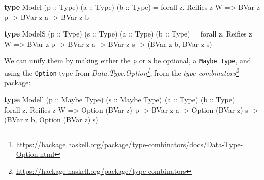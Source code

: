 \documentclass[]{article}
\newenvironment{Shaded}{}{}
\newcommand{\DataTypeTok}[1]{\textcolor[rgb]{0.56,0.13,0.00}{#1}}
\newcommand{\FunctionTok}[1]{\textcolor[rgb]{0.02,0.16,0.49}{#1}}
\newcommand{\KeywordTok}[1]{\textcolor[rgb]{0.00,0.44,0.13}{\textbf{#1}}}
\newcommand{\NormalTok}[1]{#1}
\newcommand{\OtherTok}[1]{\textcolor[rgb]{0.00,0.44,0.13}{#1}}
\renewcommand{\href}[2]{#2\footnote{\url{#1}}}
\begin{document}
\begin{Shaded}
\begin{Highlighting}[]
\KeywordTok{type} \DataTypeTok{Model}\NormalTok{ (}\OtherTok{p ::} \DataTypeTok{Type}\NormalTok{) (}\OtherTok{a ::} \DataTypeTok{Type}\NormalTok{) (}\OtherTok{b ::} \DataTypeTok{Type}\NormalTok{) }\FunctionTok{=}
\NormalTok{       forall z}\FunctionTok{.} \DataTypeTok{Reifies}\NormalTok{ z }\DataTypeTok{W}
    \OtherTok{=>} \DataTypeTok{BVar}\NormalTok{ z p}
    \OtherTok{->} \DataTypeTok{BVar}\NormalTok{ z a}
    \OtherTok{->} \DataTypeTok{BVar}\NormalTok{ z b}

\KeywordTok{type} \DataTypeTok{ModelS}\NormalTok{ (}\OtherTok{p ::} \DataTypeTok{Type}\NormalTok{) (}\OtherTok{s ::} \DataTypeTok{Type}\NormalTok{) (}\OtherTok{a ::} \DataTypeTok{Type}\NormalTok{) (}\OtherTok{b ::} \DataTypeTok{Type}\NormalTok{) }\FunctionTok{=}
\NormalTok{       forall z}\FunctionTok{.} \DataTypeTok{Reifies}\NormalTok{ z }\DataTypeTok{W}
    \OtherTok{=>} \DataTypeTok{BVar}\NormalTok{ z p}
    \OtherTok{->} \DataTypeTok{BVar}\NormalTok{ z a}
    \OtherTok{->} \DataTypeTok{BVar}\NormalTok{ z s}
    \OtherTok{->}\NormalTok{ (}\DataTypeTok{BVar}\NormalTok{ z b, }\DataTypeTok{BVar}\NormalTok{ z s)}
\end{Highlighting}
\end{Shaded}

We can unify them by making either the \texttt{p} or \texttt{s} be optional, a
\texttt{Maybe\ Type}, and using the \texttt{Option} type from
\emph{\href{https://hackage.haskell.org/package/type-combinators/docs/Data-Type-Option.html}{Data.Type.Option}},
from the
\emph{\href{https://hackage.haskell.org/package/type-combinators}{type-combinators}}
package:

\begin{Shaded}
\begin{Highlighting}[]
\KeywordTok{type} \DataTypeTok{Model'}\NormalTok{ (}\OtherTok{p ::} \DataTypeTok{Maybe} \DataTypeTok{Type}\NormalTok{) (}\OtherTok{s ::} \DataTypeTok{Maybe} \DataTypeTok{Type}\NormalTok{) (}\OtherTok{a ::} \DataTypeTok{Type}\NormalTok{) (}\OtherTok{b ::} \DataTypeTok{Type}\NormalTok{) }\FunctionTok{=}
\NormalTok{       forall z}\FunctionTok{.} \DataTypeTok{Reifies}\NormalTok{ z }\DataTypeTok{W}
    \OtherTok{=>} \DataTypeTok{Option}\NormalTok{ (}\DataTypeTok{BVar}\NormalTok{ z) p}
    \OtherTok{->} \DataTypeTok{BVar}\NormalTok{ z a}
    \OtherTok{->} \DataTypeTok{Option}\NormalTok{ (}\DataTypeTok{BVar}\NormalTok{ z) s}
    \OtherTok{->}\NormalTok{ (}\DataTypeTok{BVar}\NormalTok{ z b, }\DataTypeTok{Option}\NormalTok{ (}\DataTypeTok{BVar}\NormalTok{ z) s)}
\end{Highlighting}
\end{Shaded}
\end{document}
